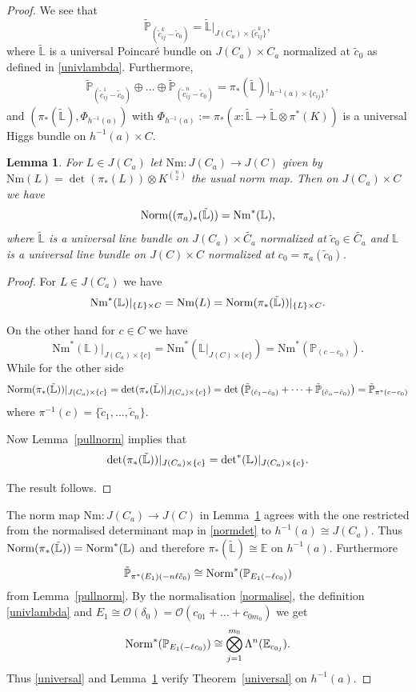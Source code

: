 \documentclass[12pt]{article}
\numberwithin{equation}{section}
\newtheorem{lemma}[theorem]{Lemma}
\theoremstyle{remark}
\theoremstyle{definition}
\numberwithin{theorem}{section}
\def\beq{\begin{eqnarray}}
\def\eeq{\end{eqnarray}}
\def\Nm{{\rm Norm}}
\def\bE{{\mathbb{E}}}
\def\bPhi{{\mathbb{\Phi}}}
\def\L{\mathbb{L}}
\def\P{\mathbb{P}}
\def\calO{{\mathcal O}}
\renewcommand{\1}{\mathbbm{1}}
\begin{document}
\begin{proof}
	We see that $$\tilde{\P}_{(\tilde{c}^{k}_{ij}-\tilde{c}_0)}=\tilde{\L}|_{J(C_a)\times \{\tilde{c}^{k}_{ij}\}},$$ where $\tilde{\L}$ is a universal Poincar\'e bundle on $J(C_a)\times C_a$ normalized at $\tilde{c}_0$ as defined in \eqref{univlambda}. Furthermore, \beq\label{universal}\tilde{\P}_{(\tilde{c}^{1}_{ij}-\tilde{c}_0)}\oplus \dots \oplus \tilde{\P}_{(\tilde{c}^{n}_{ij}-\tilde{c}_0)}=\pi_*(\tilde{\L})|_{h^{-1}(a)\times\{c_{ij}\}},\eeq and $(\pi_*(\tilde{\L}),\bPhi_{h^{-1}(a)})$ with $\bPhi_{h^{-1}(a)}:=\pi_*(x:\tilde{\L}\to \tilde{\L}\otimes \pi^*(K))$ is a universal Higgs bundle on $h^{-1}(a)\times C$. 
	
	\begin{lemma}\label{detpull} For  $L\in J(C_a)$ let ${\mathrm{Nm}}:J(C_a)\to J(C)$ given by ${\mathrm{Nm}}(L)=\det(\pi_*(L))\otimes K^{n\choose 2}$ the usual norm map. Then on $J(C_a)\times C$  we have $$\Nm((\pi_a)_*(\tilde{\L}))={\mathrm{Nm}}^*(\L),$$ where $\tilde{\L}$ is a universal line bundle on $J(C_a)\times \tilde{C_a}$ normalized at $\tilde{c}_0\in \tilde{C_a}$ and $\L$ is a universal line bundle on $J(C)\times C$ normalized at $c_0=\pi_a(\tilde{c}_0)$. 
	\end{lemma}
	\begin{proof} For  $L\in J(C_a)$ we have $${\mathrm{Nm}}^*(\L)|_{\{L\}\times C}={\mathrm{Nm}}(L)=\Nm(\pi_*(\tilde{\L}))|_{\{L\}\times C}
		.$$
		
		On the other hand for $c\in C$ we have $${\mathrm{Nm}}^*(\L)|_{J(C_a)\times\{c\} }={\mathrm{Nm}}^*(\L|_{J(C)\times\{c\}})={\mathrm{Nm}}^*(\P_{(c-c_0)}).$$
		While for the other side $$\Nm(\pi_*(\tilde{\L}))|_{J(C_a)\times\{c\} }=\det(\pi_*(\tilde{\L})|_{J(C_a)\times\{c\} })=\det\left(\tilde{\P}_{(\tilde{c}_1-\tilde{c}_0)}+\dots+\tilde{\P}_{(\tilde{c}_n-\tilde{c}_0)}\right)=\tilde{\P}_{\pi^*(c-c_0)}$$ where $\pi^{-1}(c)=\{\tilde{c}_1,\dots,\tilde{c}_n\}$.
		
		Now Lemma~\ref{pullnorm} implies that  $$\det(\pi_*(\tilde{\L}))|_{J(C_a)\times\{c\} }= {\rm det}^*(\L)|_{J(C_a)\times\{c\} }.$$
		
		The result follows. 
	\end{proof}
	The norm map ${\mathrm{Nm}}:J(C_a)\to J(C)$ in Lemma~\ref{detpull} agrees with the one restricted from
	the normalised determinant map in \eqref{normdet} to $h^{-1}(a)\cong J(C_a)$. Thus $\Nm(\pi_*(\tilde{\L}))=\Nm^*({\L})$ and therefore  $\pi_*(\tilde{\L})\cong \bE$ on $h^{-1}(a)$. Furthermore $$ \tilde{\P}_{\pi^*(E_1)(-n\ell \tilde{c}_0)}\cong \Nm^*(\P_{E_1(-\ell c_0)})$$ from Lemma~\ref{pullnorm}. By the normalisation \eqref{normalise}, the definition \eqref{univlambda} and $E_1\cong\calO(\delta_0)=\calO(c_{01}+\dots+c_{0m_0})$   we get \beq\label{normdeterminant}\Nm^*(\P_{E_1(-\ell c_0)})\cong \bigotimes_{j=1}^{m_0} \Lambda^{n}(\bE_{c_{0j}}).\eeq Thus \eqref{universal} and Lemma~\ref{detpull} verify Theorem~\ref{universal} on $h^{-1}(a)$.
	

\end{proof}
\end{document}
